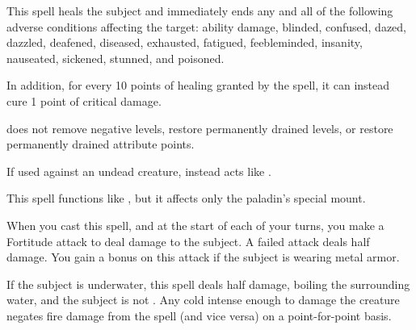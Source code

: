 \spellrng{\rngtouch}
\begin{spelleffect}
  This spell heals the subject and immediately ends any and all of the following adverse conditions affecting the target: ability damage, blinded, confused, dazed, dazzled, deafened, diseased, exhausted, fatigued, feebleminded, insanity, nauseated, sickened, stunned, and poisoned.

  \par In addition, for every 10 points of healing granted by the spell, it can instead cure 1 point of critical damage.
\end{spelleffect}
\begin{spellnotes}
   does not remove negative levels, restore permanently drained levels, or restore permanently drained attribute points.
  \par If used against an undead creature,  instead acts like .
\end{spellnotes}

\spellrng{\rngtouch}
\begin{spelleffect}
  This spell functions like , but it affects only the paladin's special mount.
\end{spelleffect}

\spellrng{\rngmed}
\begin{spelleffect}
    When you cast this spell, and at the start of each of your turns, you make a Fortitude attack to deal damage to the subject. A failed attack deals half damage. You gain a  bonus on this attack if the subject is wearing metal armor.
\end{spelleffect}
\begin{spellnotes}
  If the subject is underwater, this spell deals half damage, boiling the surrounding water, and the subject is not \vulnerable. Any cold intense enough to damage the creature negates fire damage from the spell (and vice versa) on a point-for-point basis.
\end{spellnotes}

